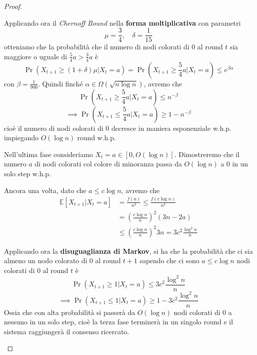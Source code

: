 \begin{teorema}
\begin{proof}
\begin{description}
            Applicando ora il \textit{Chernoff Bound} nella \textbf{forma moltiplicativa} con parametri
            \[
                \mu = \frac{3}{4}, \quad \delta = \frac{1}{15}
            \]
            otteniamo che la probabilità che il numero di nodi colorati di $0$ al round $t$ sia maggiore o uguale di $\frac{5}{4}a > \frac{3}{4}a$ è
            \[
                \Pr (X_{t+1} \geq (1 + \delta)\mu | X_t = a) = \Pr (X_{t+1} \geq \frac{5}{4}a | X_t = a) \leq e^{\beta \alpha}
            \]
            con $\beta = \frac{1}{900}$. Quindi finché $\alpha \in \Omega(\sqrt{n \log n})$, avremo che
            \[
                \Pr(X_{t+1} \geq \frac{5}{4}a | X_t = a) \leq n^{-\beta}
            \]
            \[
                \implies \Pr(X_{t+1} \leq \frac{5}{4}a | X_t = a) \geq 1 - n^{-\beta}
            \]
            cioè il numero di nodi colorati di $0$ decresce in maniera esponenziale w.h.p. impiegando $O(\log n)$ round w.h.p.

            \item[FASE 3] Nell'ultima fase consideriamo $X_t = a \in [0, O(\log n)]$. Dimostreremo che il numero $a$ di nodi colorati col colore di minoranza passa da $O(\log n)$ a $0$ in un solo step w.h.p.
            
            Ancora una volta, dato che $a \leq c \log n$, avremo che 
            \begin{align*}
                \mathbb{E}[X_{t+1} | X_t = a] &= \frac{f(a)}{n^2} \leq \frac{f(c \log n)}{n^2} \\
                &= \left( \frac{c \log n}{n} \right)^2 (3n - 2a) \\  
                &\leq \left( \frac{c \log n}{n} \right)^2 3n = 3c^2 \frac{\log^2 n}{n}
            \end{align*}

            Applicando ora la \textbf{disuguaglianza di Markov}, si ha che la probabilità che ci sia almeno un nodo colorato di $0$ al round $t + 1$ sapendo che ci sono $a \leq c\log n$ nodi colorati di $0$ al round $t$ è 
            \[
                \Pr(X_{t+1} \geq 1 | X_t = a) \leq 3c^2 \frac{\log^2 n}{n}
            \]
            \[
                \implies \Pr(X_{t+1} \leq 1 | X_t = a) \geq 1 - 3c^2 \frac{\log^2 n}{n}
            \]
            Ossia che con alta probabilità si passerà da $O(\log n)$ nodi colorati di $0$ a nessuno in un solo step, cioè la terza fase terminerà in un singolo round e il sistema raggiungerà il consenso ricercato.
        \end{description}
    \end{proof}
\end{teorema}